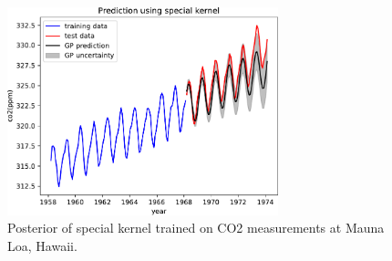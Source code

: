 \begin{figure}[htbp]
  \centering
  \includegraphics[width=0.7\textwidth]{./figures/gp_predict_special.pdf}
  \caption{
    Posterior of special kernel trained on
    CO2 measurements at Mauna Loa, Hawaii.
  }
  \label{fig:week5:gp:predict:special}
\end{figure}
